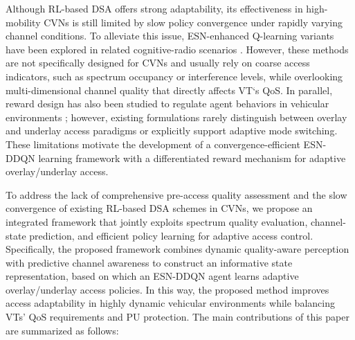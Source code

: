 \documentclass[journal]{IEEEtran}
\begin{document}
Although RL-based DSA offers strong adaptability, its effectiveness in high-mobility CVNs is still limited by slow policy convergence under rapidly varying channel conditions. To alleviate this issue, ESN-enhanced Q-learning variants have been explored in related cognitive-radio scenarios \cite{ref19}. However, these methods are not specifically designed for CVNs and usually rely on coarse access indicators, such as spectrum occupancy or interference levels, while overlooking multi-dimensional channel quality that directly affects VT‘s QoS. In parallel, reward design has also been studied to regulate agent behaviors in vehicular environments \cite{ref20}; however, existing formulations rarely distinguish between overlay and underlay access paradigms or explicitly support adaptive mode switching. These limitations motivate the development of a convergence-efficient ESN-DDQN learning framework with a differentiated reward mechanism for adaptive overlay/underlay access.\par
To address the lack of comprehensive pre-access quality assessment and the slow convergence of existing RL-based DSA schemes in CVNs, we propose an integrated framework that jointly exploits spectrum quality evaluation, channel-state prediction, and efficient policy learning for adaptive access control. Specifically, the proposed framework combines dynamic quality-aware perception with predictive channel awareness to construct an informative state representation, based on which an ESN-DDQN agent learns adaptive overlay/underlay access policies. In this way, the proposed method improves access adaptability in highly dynamic vehicular environments while balancing VTs’ QoS requirements and PU protection. The main contributions of this paper are summarized as follows:
\end{document}
